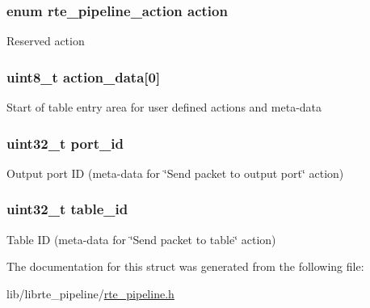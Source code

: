 \subsubsection[{action}]{\setlength{\rightskip}{0pt plus 5cm}enum {\bf rte\+\_\+pipeline\+\_\+action} action}\label{structrte__pipeline__table__entry_ab65480a4c6171d9ea813e0b1be3afef2}
Reserved action \hypertarget{structrte__pipeline__table__entry_aa5ad05f37ac81926ffee6f7168606712}{}
\subsubsection[{action\+\_\+data}]{\setlength{\rightskip}{0pt plus 5cm}uint8\+\_\+t action\+\_\+data\mbox{[}0\mbox{]}}\label{structrte__pipeline__table__entry_aa5ad05f37ac81926ffee6f7168606712}
Start of table entry area for user defined actions and meta-\/data \hypertarget{structrte__pipeline__table__entry_a6f54b893342775cdf092c6646e57c83b}{}
\subsubsection[{port\+\_\+id}]{\setlength{\rightskip}{0pt plus 5cm}uint32\+\_\+t port\+\_\+id}\label{structrte__pipeline__table__entry_a6f54b893342775cdf092c6646e57c83b}
Output port I\+D (meta-\/data for \char`\"{}\+Send packet to output port\char`\"{} action) \hypertarget{structrte__pipeline__table__entry_a4783596f73bb7e535d78875dbf3397b0}{}
\subsubsection[{table\+\_\+id}]{\setlength{\rightskip}{0pt plus 5cm}uint32\+\_\+t table\+\_\+id}\label{structrte__pipeline__table__entry_a4783596f73bb7e535d78875dbf3397b0}
Table I\+D (meta-\/data for \char`\"{}\+Send packet to table\char`\"{} action) 

The documentation for this struct was generated from the following file\+:\begin{DoxyCompactItemize}
\item 
lib/librte\+\_\+pipeline/\hyperlink{rte__pipeline_8h}{rte\+\_\+pipeline.\+h}\end{DoxyCompactItemize}
